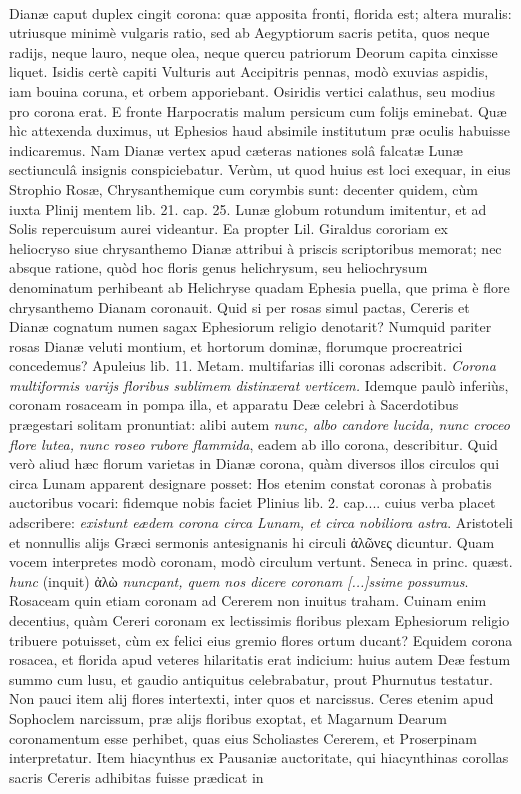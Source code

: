 \documentclass[a4paper, 11pt, oneside, polutonikogreek, latin]{article}
\begin{document}
\paragraph{}
Dianæ caput duplex cingit corona: quæ apposita fronti, florida est; altera muralis: utriusque minimè vulgaris ratio, sed ab Aegyptiorum sacris petita, quos neque radijs, neque lauro, neque olea, neque quercu patriorum Deorum capita cinxisse liquet. Isidis certè capiti Vulturis aut Accipitris pennas, modò exuvias aspidis, iam bouina coruna, et orbem apporiebant. Osiridis vertici calathus, seu modius pro corona erat. E fronte Harpocratis malum persicum cum folijs eminebat. Quæ hìc attexenda duximus, ut Ephesios haud absimile institutum præ oculis habuisse indicaremus. Nam Dianæ vertex apud cæteras nationes solâ falcatæ Lunæ sectiunculâ insignis conspiciebatur. Verùm, ut quod huius est loci exequar, in eius Strophio Rosæ, Chrysanthemique cum corymbis sunt: decenter quidem, cùm iuxta Plinij mentem lib. 21. cap. 25. Lunæ globum rotundum imitentur, et ad Solis repercuisum aurei videantur. Ea propter Lil. Giraldus cororiam ex heliocryso siue chrysanthemo Dianæ attribui à priscis scriptoribus memorat; nec absque ratione, quòd hoc floris genus helichrysum, seu heliochrysum denominatum perhibeant ab Helichryse quadam Ephesia puella, que prima è flore chrysanthemo Dianam coronauit. Quid si per rosas simul pactas, Cereris et Dianæ cognatum numen sagax Ephesiorum religio denotarit? Numquid pariter rosas Dianæ veluti montium, et hortorum dominæ, florumque procreatrici concedemus? Apuleius lib. 11. Metam. multifarias illi coronas adscribit. \emph{Corona multiformis varijs floribus sublimem distinxerat verticem.} Idemque paulò inferiùs, coronam rosaceam in pompa illa, et apparatu Deæ celebri à Sacerdotibus prægestari solitam pronuntiat: alibi autem \emph{nunc, albo candore lucida, nunc croceo flore lutea, nunc roseo rubore flammida}, eadem ab illo corona, describitur. Quid verò aliud hæc florum varietas in Dianæ corona, quàm diversos illos circulos qui circa Lunam apparent designare posset: Hos etenim constat coronas à probatis auctoribus vocari: fidemque nobis faciet Plinius lib. 2. cap.... cuius verba placet adscribere: \emph{existunt eædem corona circa Lunam, et circa nobiliora astra}. Aristoteli et nonnullis alijs Græci sermonis antesignanis hi circuli ἁλῶνες dicuntur. Quam vocem interpretes modò coronam, modò circulum vertunt. Seneca in princ. quæst. \emph{hunc} (inquit) ἀλὼ \emph{nuncpant, quem nos dicere coronam [...]ssime possumus}. Rosaceam quin etiam coronam ad Cererem non inuitus traham. Cuinam enim decentius, quàm Cereri coronam ex lectissimis floribus plexam Ephesiorum religio tribuere potuisset, cùm ex felici eius gremio flores ortum ducant? Equidem corona rosacea, et florida apud veteres hilaritatis erat indicium: huius autem Deæ festum summo cum lusu, et gaudio antiquitus celebrabatur, prout Phurnutus testatur. Non pauci item alij flores intertexti, inter quos et narcissus. Ceres etenim apud Sophoclem narcissum, præ alijs floribus exoptat, et Magarnum Dearum coronamentum esse perhibet, quas eius Scholiastes Cererem, et Proserpinam interpretatur. Item hiacynthus ex Pausaniæ auctoritate, qui hiacynthinas corollas sacris Cereris adhibitas fuisse prædicat in 
\end{document}
